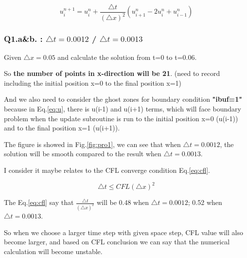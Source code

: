 \documentclass{article}
\begin{document}
\begin{equation}
    u_i^{n+1}=
    u_i^{n}+
    \frac{\triangle t}{(\triangle x)^2}
    (u_{i+1}^{n}-2u_i^{n}+u_{i-1}^{n})
    \label{eq:u}
\end{equation}

\subsubsection*{Q1.a\&b. : $\triangle t=0.0012$ / $\triangle t=0.0013$}
Given $\triangle x=0.05$ and calculate the solution from t=0 to t=0.06.

So \textbf{the number of points in x-direction will be 21}.
(need to record including the initial position x=0 to the final position x=1)

And we also need to consider the ghost zones for boundary condition \textbf{"ibuf=1"} because in Eq.\ref{eq:u}, there is u(i-1) and u(i+1) terms, which will face boundary problem when the update subroutine is run to the initial position x=0 (u(i-1)) and to the final position x=1 (u(i+1)).

The figure is showed in Fig.\ref{fig:pro1}, we can see that when $\triangle t=0.0012$, the solution will be smooth compared to the result when $\triangle t=0.0013$.

I consider it maybe relates to the CFL converge condition Eq.\ref{eq:cfl}.

\begin{equation}
    \triangle t \leq CFL (\triangle x)^2
    \label{eq:cfl}
\end{equation}

The Eq.\ref{eq:cfl} say that $\frac{\triangle t}{(\triangle x)^2}$ will be 0.48 when $\triangle t=0.0012$; 0.52 when $\triangle t=0.0013$.

So when we choose a larger time step with given space step, CFL value will also become larger, and based on CFL conclusion we can say that the numerical calculation will become unstable.
\end{document}
